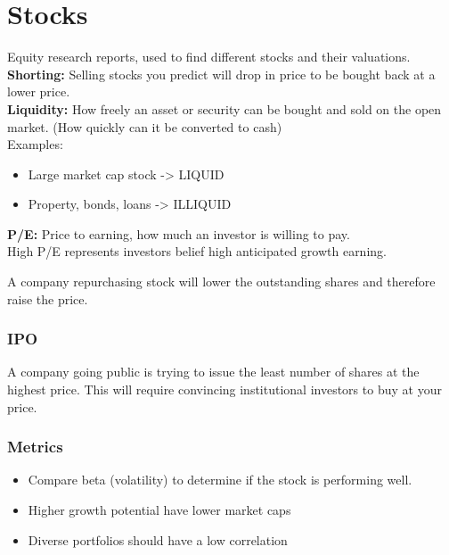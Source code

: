 \documentclass[11pt]{scrartcl} %
\begin{document}
\section{Stocks}

Equity research reports, used to find different stocks and their valuations.\\

\textbf{Shorting:} Selling stocks you predict will drop in price to be bought back at a lower price.\\

\textbf{Liquidity:} How freely an asset or security can be bought and sold on the open market. (How quickly can it be converted to cash)\\

Examples:
\begin{itemize}
	\item Large market cap stock -> LIQUID
	\item Property, bonds, loans -> ILLIQUID
\end{itemize}

\textbf{P/E:} Price to earning, how much an investor is willing to pay.\\

High P/E represents investors belief high anticipated growth earning.

A company repurchasing stock will lower the outstanding shares and therefore raise the price.

\subsubsection{IPO}

A company going public is trying to issue the least number of shares at the highest price. This will require convincing institutional investors to buy at your price.

\subsubsection{Metrics}

\begin{itemize}
	\item Compare beta (volatility) to determine if the stock is performing well.
	\item Higher growth potential have lower market caps
	\item Diverse portfolios should have a low correlation
\end{itemize}
\end{document}
